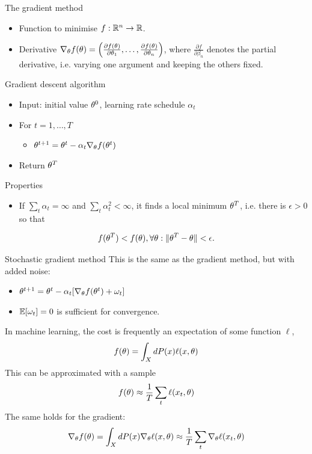 \documentclass[smaller]{beamer}
\begin{document}
\begin{frame}[label={sec:orgbd1d4d0}]{The gradient method}
\begin{itemize}
\item Function to minimise \(f : \mathbb{R}^n \to \mathbb{R}\).
\item Derivative \(\nabla_\theta f(\theta)  = \left(\frac{\partial f(\theta)}{\partial \theta_1}, \ldots, \frac{\partial f(\theta)}{\partial \theta_n}\right)\),
where \(\frac{\partial f}{\partial \beta_n}\) denotes the \alert{partial} derivative, i.e. varying one argument and keeping the others fixed.
\end{itemize}
\begin{block}{Gradient descent algorithm}
\begin{itemize}
\item Input: initial value \(\theta^0\), learning rate schedule \(\alpha_t\)
\item For \(t=1, \ldots, T\)
\begin{itemize}
\item \(\theta^{t+1} = \theta^t - \alpha_t \nabla_\theta f(\theta^t)\)
\end{itemize}
\item Return \(\theta^T\)
\end{itemize}
\end{block}

\begin{block}{Properties}
\begin{itemize}
\item If \(\sum_t \alpha_t = \infty\) and \(\sum_t \alpha_t^2 < \infty\), it finds a local minimum \(\theta^T\), i.e. there is \(\epsilon > 0\) so that
\end{itemize}
\[
f(\theta^T) < f(\theta), \forall \theta: \|\theta^T - \theta\| < \epsilon.
\]
\end{block}
\end{frame}
\begin{frame}[label={sec:org37a746e}]{Stochastic gradient method}
This is the same as the gradient method, but with added noise:
\begin{itemize}
\item \(\theta^{t+1} = \theta^t - \alpha_t [\nabla_\theta f(\theta^t) + \omega_t]\)
\item \(\mathop{\mbox{\ensuremath{\mathbb{E}}}}\nolimits[\omega_t] = 0\) is sufficient for convergence.
\end{itemize}
\pause
\begin{example}
In machine learning, the cost is frequently an expectation of some function \(\ell\), 
\[
f(\theta) = \int_X dP(x) \ell(x, \theta)
\]
This can be approximated with a sample
\[
f(\theta) \approx \frac{1}{T} \sum_t \ell(x_t, \theta)
\]
The same holds for the gradient:
\[
\nabla_\theta f(\theta) = \int_X dP(x) \nabla_\theta \ell(x, \theta)
\approx \frac{1}{T} \sum_t \nabla_\theta \ell(x_t, \theta)
\]
\end{example}
\end{frame}
\end{document}
